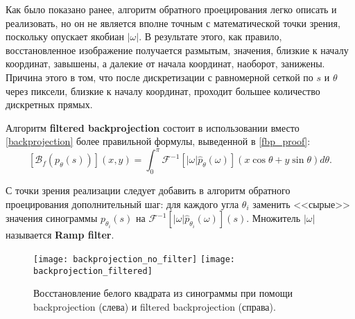 
Как было показано ранее, алгоритм обратного проецирования легко описать и реализовать, но он не является вполне точным с математической точки зрения, поскольку опускает якобиан $|\omega|$. В результате этого, как правило, восстановленное изображение получается размытым, значения, близкие к началу координат, завышены, а далекие от начала координат, наоборот, занижены. Причина этого в том, что после дискретизации с равномерной сеткой по $s$ и $\theta$ через пиксели, близкие к началу координат, проходит большее количество дискретных прямых.

Алгоритм \textbf{filtered backprojection} состоит в использовании вместо \eqref{backprojection} более правильной формулы, выведенной в \eqref{fbp_proof}:
\begin{equation}
\label{filtered_backprojection}
    \left[ \mathcal{B}_{f}(p_\theta(s)) \right](x, y) = \int_0^\pi \mathcal{F}^{-1}\left[ |\omega| \hat{p}_\theta(\omega) \right]\left( x\cos\theta + y\sin\theta \right) d\theta.
\end{equation}

С точки зрения реализации следует добавить в алгоритм обратного проецирования дополнительный шаг: для каждого угла $\theta_i$ заменить <<сырые>> значения синограммы $p_{\theta_i}(s)$ на $\mathcal{F}^{-1}\left[ |\omega| \hat{p}_{\theta_i}(\omega) \right](s)$. Множитель $|\omega|$ называется \textbf{Ramp filter}.

\begin{figure}[!h]
    \centering
    \texttt{[image: backprojection\_no\_filter]}
    \texttt{[image: backprojection\_filtered]}
    \caption{Восстановление белого квадрата из синограммы при помощи backprojection (слева) и filtered backprojection (справа).}
\end{figure}
